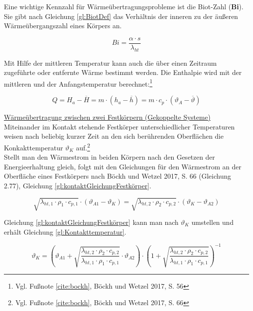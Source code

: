 Eine wichtige Kennzahl für Wärmeübertragungsprobleme ist die Biot-Zahl (\textbf{Bi}). Sie gibt nach Gleichung \ref{gl:BiotDef} das Verhältnis der inneren zu der äußeren Wärmeübergangszahl eines Körpers an.

\begin{equation}
	Bi = \frac{\alpha \cdot s}{\lambda_{ht}} \label{gl:BiotDef}
\end{equation}

Mit Hilfe der mittleren Temperatur kann auch die über einen Zeitraum zugeführte oder entfernte Wärme bestimmt werden. Die Enthalpie wird mit der mittleren und der Anfangstemperatur berechnet:\footnote{Vgl. Fußnote \ref{cite:bockh}, Böckh und Wetzel 2017, S. 56}

\begin{equation}
	Q = H_{a} - \overline{H} = m \cdot (h_{a} - \overline{h}) = m \cdot c_{p} \cdot (\vartheta_{A} - \overline{\vartheta}) \label{gl:gesamtWaermeUebertragen}
\end{equation}

\underline{Wärmeübertragung zwischen zwei Festkörpern (Gekoppelte Systeme)}
\\

Miteinander im Kontakt stehende Festkörper unterschiedlicher Temperaturen weisen nach beliebig kurzer Zeit an den sich berührenden Oberflächen die Konkakttemperatur $\vartheta_{K}$ auf.\footnote{Vgl. Fußnote \ref{cite:bockh}, Böckh und Wetzel 2017, S. 66} \\
Stellt man den Wärmestrom in beiden Körpern nach den Gesetzen der Energieerhaltung gleich, folgt mit den Gleichungen für den Wärmestrom an der Oberfläche eines Festkörpers nach Böckh und Wetzel 2017, S. 66 (Gleichung 2.77), Gleichung \ref{gl:kontaktGleichungFestkörper}.

\begin{equation}
	\sqrt{\lambda_{ht,1} \cdot \rho_{1} \cdot c_{p,1}} \cdot (\vartheta_{A1} - \vartheta_{K}) = \sqrt{\lambda_{ht,2} \cdot \rho_{2} \cdot c_{p,2}} \cdot (\vartheta_{K} - \vartheta_{A2}) \label{gl:kontaktGleichungFestkörper}
\end{equation}

Gleichung \ref{gl:kontaktGleichungFestkörper} kann man nach $\vartheta_{K}$ umstellen und erhält Gleichung \ref{gl:Kontakttemperatur}.

\begin{equation}
	\vartheta_{K} = \left( \vartheta_{A1} + \sqrt{\frac{\lambda_{ht,2} \cdot \rho_{2} \cdot c_{p,2}}{\lambda_{ht,1} \cdot \rho_{1} \cdot c_{p,1}}} \cdot \vartheta_{A2} \right) \cdot \left( 1 + \sqrt{\frac{\lambda_{ht,2} \cdot \rho_{2} \cdot c_{p,2}}{\lambda_{ht,1} \cdot \rho_{1} \cdot c_{p,1}}} \right)^{-1} \label{gl:Kontakttemperatur}
\end{equation}
 

